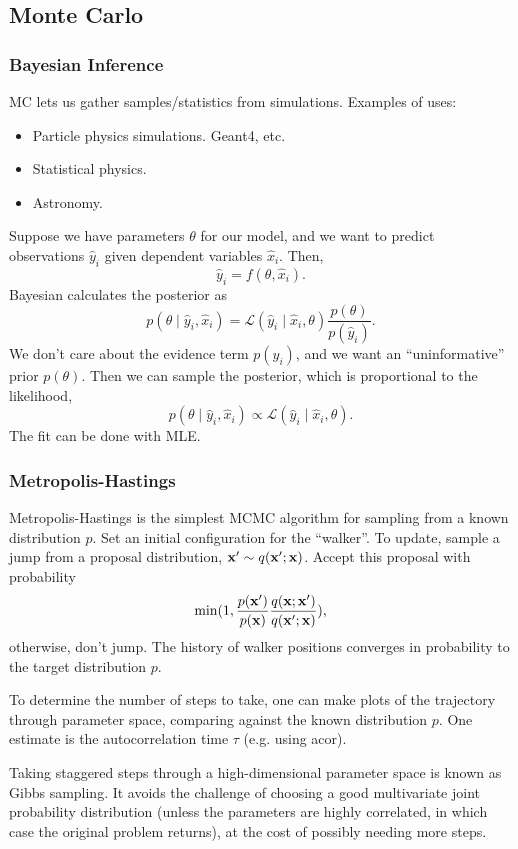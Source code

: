 \documentclass[12pt,letterpaper]{article}
\begin{document}
\subsection{Monte Carlo}
\subsubsection{Bayesian Inference}
MC lets us gather samples/statistics from simulations. Examples of uses:
\begin{itemize}
    \item Particle physics simulations. Geant4, etc.
    \item Statistical physics.
    \item Astronomy.
\end{itemize}
Suppose we have parameters $\theta$ for our model, and we want to predict observations $\hat y_i$ given dependent variables $\hat x_i$. Then,
\[\hat y_i=f(\theta,\hat x_i).\]
Bayesian calculates the posterior as
\[p(\theta\mid\hat y_i,\hat x_i)=\mathcal L(\hat y_i\mid\hat x_i,\theta)\frac{p(\theta)}{p(\hat y_i)}.\]
We don't care about the evidence term $p(y_i)$, and we want an ``uninformative'' prior $p(\theta)$. Then we can sample the posterior, which is proportional to the likelihood,
\[p(\theta\mid\hat y_i,\hat x_i)\propto\mathcal L(\hat y_i\mid\hat x_i,\theta).\]
The fit can be done with MLE.
\subsubsection{Metropolis-Hastings}
Metropolis-Hastings is the simplest MCMC algorithm for sampling from a known distribution $p$. Set an initial configuration for the ``walker''. To update, sample a jump from a proposal distribution, $\vb{x'}\sim q(\vb{x'};\vb{x})$. Accept this proposal with probability
\[\min(1,\frac{p(\vb{x'})}{p(\vb{x})}\frac{q(\vb{x};\vb{x'})}{q(\vb{x'};\vb{x})}),\]
otherwise, don't jump. The history of walker positions converges in probability to the target distribution $p$.

To determine the number of steps to take, one can make plots of the trajectory through parameter space, comparing against the known distribution $p$. One estimate is the autocorrelation time $\tau$ (e.g. using acor).

Taking staggered steps through a high-dimensional parameter space is known as Gibbs sampling. It avoids the challenge of choosing a good multivariate joint probability distribution (unless the parameters are highly correlated, in which case the original problem returns), at the cost of possibly needing more steps.
\end{document}
